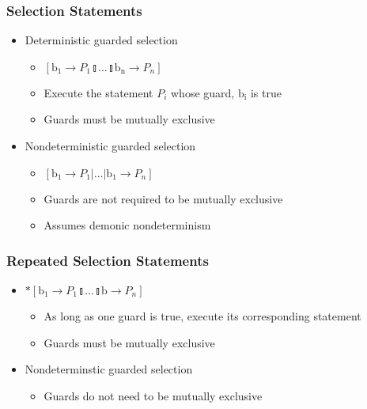 \documentclass[compress]{beamer}
\begin{document}
\begin{frame}
\frametitle{Selection Statements}
\begin{itemize}
\item Deterministic guarded selection
\begin{itemize}
\item $[\mathrm{b_1} \rightarrow P_1 \talloblong ... \talloblong \mathrm{b_n} \rightarrow P_n]$
\item Execute the statement $P_i$ whose guard, $\mathrm{b_i}$ is true
\item Guards must be mutually exclusive
\end{itemize}
\pause
\item Nondeterministic guarded selection
\begin{itemize}
\item $ [\textrm{b}_1 \rightarrow P_1 | \ldots | \textrm{b}_1 \rightarrow P_n ] $
\item Guards are not required to be mutually exclusive
\item Assumes demonic nondeterminism
\end{itemize}
\end{itemize}
\end{frame}
\begin{frame}
\frametitle{Repeated Selection Statements}
\begin{itemize}
\item  $*[\textrm{b}_1 \rightarrow P_1 \talloblong ... \talloblong \textrm{b} \rightarrow P_n]$
\begin{itemize}
\item As long as one guard is true, execute its corresponding statement
\item Guards must be mutually exclusive
\end{itemize}
\pause
\item Nondeterminstic guarded selection
\begin{itemize}
\item Guards do not need to be mutually exclusive
\end{itemize}
\end{itemize}
\end{frame}
\end{document}
